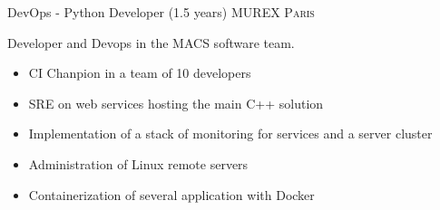 \documentclass[10pt,a4paper]{moderncv}
\begin{document}
{DevOps - Python Developer (1.5 years) }
{MUREX}
{\textsc{Paris}}
{}
{Developer and Devops in the MACS software team.
\begin{itemize}
\item CI Chanpion in a team of 10 developers
\item SRE on web services hosting the main C++ solution
\item Implementation of a stack of monitoring for services and a server cluster
\item Administration of Linux remote servers
\item Containerization of several application with Docker
\end{itemize}
}
\end{document}
